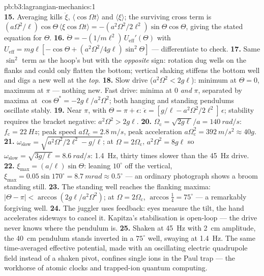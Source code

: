 \begin{solution}{pb:b3:lagrangian-mechanics:1}
\[\]
\textbf{15.} Averaging kills $\ddot\xi$, $\langle\cos\Omega t\rangle$
and $\langle\xi\rangle$; the surviving cross term is
$(a\Omega^2/\ell)\cos\Theta\,\langle\xi\cos\Omega t\rangle =
-(a^2\Omega^2/2\ell^2)\sin\Theta\cos\Theta$, giving the stated
equation for $\Theta$.
\textbf{16.} $\ddot\Theta = -(1/m\ell^2)\,U_{\text{eff}}'(\Theta)$ with
$U_{\text{eff}} = mg\ell[-\cos\Theta + (a^2\Omega^2/4g\ell)
\sin^2\Theta]$ --- differentiate to check.
\textbf{17.} Same $\sin^2$ term as the hoop's but with the
\emph{opposite} sign: rotation dug wells on the flanks and could only
flatten the bottom; vertical shaking stiffens the bottom well and digs
a new well at the \emph{top}.
\textbf{18.} Slow drive ($a^2\Omega^2 < 2g\ell$): minimum at $\Theta =
0$, maximum at $\pi$ --- nothing new. Fast drive: minima at $0$
\emph{and} $\pi$, separated by maxima at $\cos\Theta^* =
-2g\ell/a^2\Omega^2$; both hanging and standing pendulums oscillate
stably.
\textbf{19.} Near $\pi$, with $\Theta = \pi + \epsilon$:
$\ddot\epsilon = [g/\ell - a^2\Omega^2/2\ell^2]\,\epsilon$; stability
requires the bracket negative: $a^2\Omega^2 > 2g\ell$.
\textbf{20.} $\Omega_{\text{c}} = \sqrt{2g\ell}/a = \qty{140}{rad/s}$:
$f_{\text{c}} = \qty{22}{Hz}$; peak speed $a\Omega_{\text{c}} =
\qty{2.8}{m/s}$, peak acceleration $a\Omega_{\text{c}}^2 =
\qty{392}{m/s^2} \approx 40g$.
\textbf{21.} $\omega_{\text{slow}} = \sqrt{a^2\Omega^2/2\ell^2 -
g/\ell}$; at $\Omega = 2\Omega_{\text{c}}$, $a^2\Omega^2 = 8g\ell$ so
$\omega_{\text{slow}} = \sqrt{3g/\ell} = \qty{8.6}{rad/s}$:
\qty{1.4}{Hz}, thirty times slower than the \qty{45}{Hz} drive.
\textbf{22.} $\xi_{\max} = (a/\ell)\sin\Theta$: leaning $10^\circ$ off
the vertical, $\xi_{\max} = 0.05\sin170^\circ = \qty{8.7}{mrad}
\approx 0.5^\circ$ --- an ordinary photograph shows a broom standing
still.
\textbf{23.} The standing well reaches the flanking maxima:
$|\Theta - \pi| < \arccos(2g\ell/a^2\Omega^2)$; at $\Omega =
2\Omega_{\text{c}}$, $\arccos\tfrac14 = 75^\circ$ --- a remarkably
forgiving well.
\textbf{24.} The juggler uses feedback: eyes measure the tilt, the
hand accelerates sideways to cancel it. Kapitza's stabilisation is
open-loop --- the drive never knows where the pendulum is.
\textbf{25.} Shaken at \qty{45}{Hz} with \qty{2}{cm} amplitude, the
\qty{40}{cm} pendulum stands inverted in a $75^\circ$ well, swaying at
\qty{1.4}{Hz}. The same time-averaged effective potential, made with an
oscillating electric quadrupole field instead of a shaken pivot,
confines single ions in the Paul trap --- the workhorse of atomic
clocks and trapped-ion quantum computing.
\end{solution}
